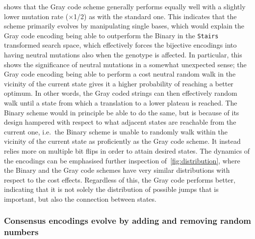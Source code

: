 \documentclass[a4paper,12pt]{article}
\theoremstyle{plain}
\theoremstyle{definition}
\begin{document}
       shows that the Gray code scheme generally
      performs equally well with a slightly lower mutation rate ($\times$1/2)
      as with the standard one. This indicates that the scheme primarily evolves by
      manipulating single bases, which would explain the Gray code encoding being able to 
      outperform the Binary in the \texttt{Stairs} transformed 
      search space, which effectively forces the bijective encodings into having
      neutral mutations also when the genotype is affected. 
      In particular, this shows the significance of neutral mutations in a
      somewhat unexpected sense; the Gray code encoding being able to 
      perform a cost neutral random walk in the vicinity of the current state gives it a higher
      probability of reaching a better optimum. In other words, the Gray coded 
      strings can then effectively random walk until a
      state from which a translation to a lower plateau is reached. 
      The Binary scheme would in principle be able to do the same, but is because of its
      design hampered with respect to what adjacent states are reachable from the current
      one, i.e.\ the Binary scheme is unable to randomly walk within the vicinity of the 
      current state as proficiently as the Gray code scheme. It instead relies
      more on multiple bit flips in order to attain desired states. The dynamics
      of the encodings can be emphasised further inspection of~\cref{fig:distribution},
      where the Binary and the Gray code schemes have very similar distributions with
      respect to the cost effects. Regardless of this, the Gray code performs better,
      indicating that it is not solely the distribution of possible jumps that
      is important, but also the connection between states. 

     
      \subsubsection{Consensus encodings evolve by adding and removing random numbers}
      
\end{document}
